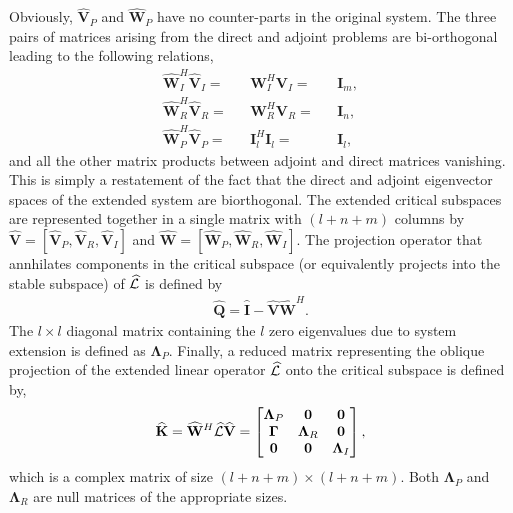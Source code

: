 Obviously, $\mathbf{\widehat{V}}_{P}$ and $\mathbf{\widehat{W}}_{P}$ have no counter-parts in the original system. The three pairs of matrices arising from the direct and adjoint problems are bi-orthogonal leading to the following relations,
\begin{subequations}
	\begin{align}
		\mathbf{\widehat{W}}^{H}_{I}\mathbf{\widehat{V}}_{I} =&& \mathbf{W}^{H}_{I}\mathbf{V}_{I} =&& \mathbf{I}_{m}, \\
		\mathbf{\widehat{W}}^{H}_{R}\mathbf{\widehat{V}}_{R} =&& \mathbf{W}^{H}_{R}\mathbf{V}_{R} =&& \mathbf{I}_{n}, \\
		\mathbf{\widehat{W}}^{H}_{P}\mathbf{\widehat{V}}_{P} =&& \mathbf{I}^{H}_{l}\mathbf{I}_{l} =&& \mathbf{I}_{l}, 
	\end{align}
\end{subequations}
and all the other matrix products between adjoint and direct matrices vanishing. This is simply a restatement of the fact that the direct and adjoint eigenvector spaces of the extended system are biorthogonal. The extended critical subspaces are represented together in a single matrix with $(l+n+m)$ columns by $\mathbf{\widehat{V}} = [\mathbf{\widehat{V}}_{P}, \mathbf{\widehat{V}}_{R}, \mathbf{\widehat{V}}_{I}]$ and $\mathbf{\widehat{W}} = [\mathbf{\widehat{W}}_{P}, \mathbf{\widehat{W}}_{R}, \mathbf{\widehat{W}}_{I}]$. The projection operator that annhilates components in the critical subspace (or equivalently projects into the stable subspace) of $\mathcal{\widehat{L}}$ is defined by
\begin{eqnarray}
	\label{eqn:stable_projector_extended}
	\mathbf{\widehat{Q}} = \mathbf{\widehat{I}} - \mathbf{\widehat{V}}\mathbf{\widehat{W}}^{H}.
\end{eqnarray}
The $l\times l$ diagonal matrix containing the $l$ zero eigenvalues due to system extension is defined as $\mathbf{\Lambda}_{P}$. 
Finally, a reduced matrix representing the oblique projection of the extended linear operator $\mathcal{\widehat{L}}$ onto the critical subspace is defined by,
\begin{eqnarray}
	\label{eqn:khat}
	\mathbf{\widehat{K}} = \mathbf{\widehat{W}}^{H}\mathcal{\widehat{L}}\mathbf{\widehat{V}} = 
	\begin{bmatrix}
		\mathbf{\Lambda}_{P} & \mathbf{0} & \mathbf{0} \\ 
 		\mathbf{\Gamma} &  \mathbf{\Lambda}_{R} & \mathbf{0} \\ 
		\mathbf{0} & \mathbf{0} & \mathbf{\Lambda}_{I} 
	\end{bmatrix},
\end{eqnarray}
which is a complex matrix of size $(l+n+m)\times(l+n+m)$. Both $\mathbf{\Lambda}_{P}$ and $\mathbf{\Lambda}_{R}$ are null matrices of the appropriate sizes.

